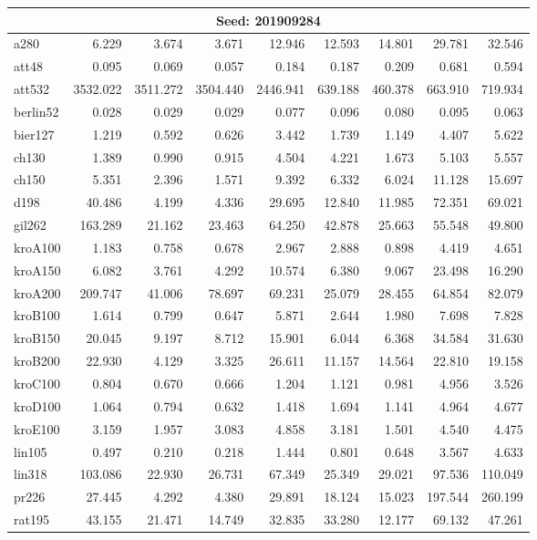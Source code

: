 \begin{center}
\begin{longtable}{lrrrrrrrr}
\hline \multicolumn{9}{c}{{Seed: 201909284}} \\ \hline
a280 &6.229 & 3.674 & 3.671 & 12.946 & 12.593 & 14.801 & 29.781 & 32.546\\
att48 & 0.095 & 0.069 & 0.057 & 0.184 & 0.187 & 0.209 & 0.681 & 0.594\\
att532 & 3532.022 & 3511.272 & 3504.440 & 2446.941 & 639.188 & 460.378 & 663.910 & 719.934\\
berlin52 & 0.028 & 0.029 & 0.029 & 0.077 & 0.096 & 0.080 & 0.095 & 0.063\\
bier127 & 1.219 & 0.592 & 0.626 & 3.442 & 1.739 & 1.149 & 4.407 & 5.622\\
ch130 & 1.389 & 0.990 & 0.915 & 4.504 & 4.221 & 1.673 & 5.103 & 5.557\\
ch150 & 5.351 & 2.396 & 1.571 & 9.392 & 6.332 & 6.024 & 11.128 & 15.697\\
d198 & 40.486 & 4.199 & 4.336 & 29.695 & 12.840 & 11.985 & 72.351 & 69.021\\
gil262 & 163.289 & 21.162 & 23.463 & 64.250 & 42.878 & 25.663 & 55.548 & 49.800\\
kroA100 & 1.183 & 0.758 & 0.678 & 2.967 & 2.888 & 0.898 & 4.419 & 4.651\\
kroA150 & 6.082 & 3.761 & 4.292 & 10.574 & 6.380 & 9.067 & 23.498 & 16.290\\
kroA200 & 209.747 & 41.006 & 78.697 & 69.231 & 25.079 & 28.455 & 64.854 & 82.079\\
kroB100 & 1.614 & 0.799 & 0.647 & 5.871 & 2.644 & 1.980 & 7.698 & 7.828\\
kroB150 & 20.045 & 9.197 & 8.712 & 15.901 & 6.044 & 6.368 & 34.584 & 31.630\\
kroB200 & 22.930 & 4.129 & 3.325 & 26.611 & 11.157 & 14.564 & 22.810 & 19.158\\
kroC100 & 0.804 & 0.670 & 0.666 & 1.204 & 1.121 & 0.981 & 4.956 & 3.526\\
kroD100 & 1.064 & 0.794 & 0.632 & 1.418 & 1.694 & 1.141 & 4.964 & 4.677\\
kroE100 & 3.159 & 1.957 & 3.083 & 4.858 & 3.181 & 1.501 & 4.540 & 4.475\\
lin105 & 0.497 & 0.210 & 0.218 & 1.444 & 0.801 & 0.648 & 3.567 & 4.633\\
lin318 & 103.086 & 22.930 & 26.731 & 67.349 & 25.349 & 29.021 & 97.536 & 110.049\\
pr226 & 27.445 & 4.292 & 4.380 & 29.891 & 18.124 & 15.023 & 197.544 & 260.199\\
rat195 & 43.155 & 21.471 & 14.749 & 32.835 & 33.280 & 12.177 & 69.132 & 47.261\\

\end{longtable}
\end{center}
